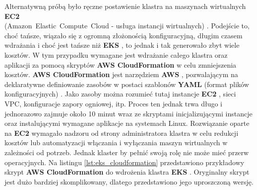 Alternatywną próbą było ręczne postawienie klastra na maszynach wirtualnych \textbf{EC2} \\ (\mbox{Amazon Elastic Compute Cloud} - usługa instancji wirtualnych) \cite{ec2_docs}. Podejście to, choć tańsze, wiązało się z ogromną złożonością konfiguracyjną, długim czasem wdrażania i choć jest tańsze niż \textbf{EKS} \cite{eks_docs}, to jednak i tak generowało zbyt wiele kosztów. W tym przypadku wymagane jest wdrażanie całego klastra oraz aplikacji za pomocą skryptów \textbf{AWS CloudFormation} \cite{cloudformation_docs} w celu zmniejszenia kosztów. \textbf{AWS CloudFormation} \cite{cloudformation_docs} jest narzędziem \textbf{AWS} \cite{aws_docs}, pozwalającym na deklaratywne definiowanie zasobów w postaci szablonów \textbf{YAML} (format plików konfiguracyjnych) \cite{yaml_spec}. Jako zasoby można rozumieć tutaj instancje \textbf{EC2} \cite{ec2_docs}, sieci VPC, konfiguracje zapory ogniowej, itp. Proces ten jednak trwa długo i jednorazowo zajmuje około 10 minut wraz ze skryptami inicjalizującymi instancje oraz instalującymi wymagane aplikacje na systemach Linux. Rozwiązanie oparte na \textbf{EC2} \cite{ec2_docs} wymagało nadzoru od strony administratora klastra w celu redukcji kosztów lub automatyzacji włączania i wyłączania maszyn wirtualnych w zależności od potrzeb. Jednak klaster by pełnić swoją rolę nie może mieć przerw operacyjnych. Na listingu \ref{lst:eks_cloudformation} przedstawiono przykładowy skrypt \textbf{AWS CloudFormation} \cite{cloudformation_docs} do wdrożenia klastra \textbf{EKS} \cite{eks_docs}. Oryginalny skrypt jest dużo bardziej skomplikowany, dlatego przedstawiono jego uproszczoną wersję.


